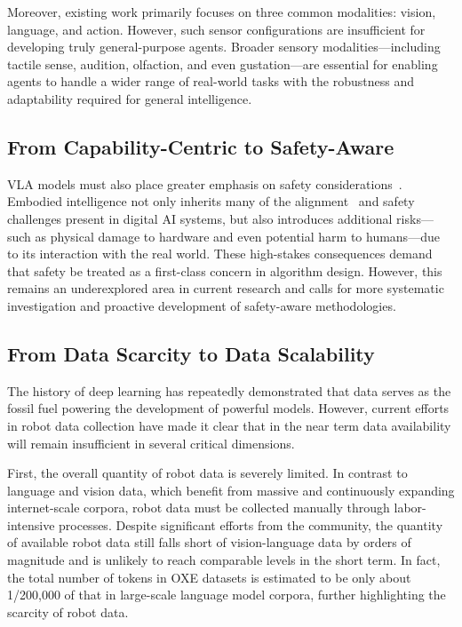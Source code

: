 \documentclass[10pt, a4paper, logo, copyright]{googledeepmind} %
\begin{document}
Moreover, existing work primarily focuses on three common modalities: vision, language, and action. However, such sensor configurations are insufficient for developing truly general-purpose agents. Broader sensory modalities---including tactile sense, audition, olfaction, and even gustation---are essential for enabling agents to handle a wider range of real-world tasks with the robustness and adaptability required for general intelligence.

\subsection{From Capability-Centric to Safety-Aware}
\label{subsec:safety}

VLA models must also place greater emphasis on safety considerations~\cite{zhang2025safevla}. Embodied intelligence not only inherits many of the alignment~\cite{ji2023ai} and safety challenges present in digital AI systems, but also introduces additional risks---such as physical damage to hardware and even potential harm to humans---due to its interaction with the real world. These high-stakes consequences demand that safety be treated as a first-class concern in algorithm design. However, this remains an underexplored area in current research and calls for more systematic investigation and proactive development of safety-aware methodologies.

\subsection{From Data Scarcity to Data Scalability}
\label{subsec:data-scalability}

The history of deep learning has repeatedly demonstrated that data serves as the fossil fuel powering the development of powerful models. However, current efforts in robot data collection have made it clear that in the near term data availability will remain insufficient in several critical dimensions.

First, the overall quantity of robot data is severely limited. In contrast to language and vision data, which benefit from massive and continuously expanding internet-scale corpora, robot data must be collected manually through labor-intensive processes. Despite significant efforts from the community, the quantity of available robot data still falls short of vision-language data by orders of magnitude and is unlikely to reach comparable levels in the short term. In fact, the total number of tokens in OXE datasets is estimated to be only about 1/200,000 of that in large-scale language model corpora, further highlighting the scarcity of robot data.
\end{document}
